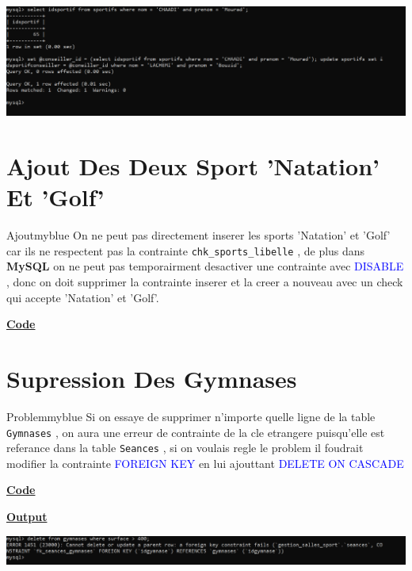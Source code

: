 \vspace{0.25cm}
\begin{center}
    \includegraphics[height=0.25\textheight]{Parties/Partie2/update.PNG}
\end{center}

\newpage
\section{Ajout Des Deux Sport 'Natation' Et 'Golf'}
\begin{prettyBox}{Ajout}{myblue}
On ne peut pas directement inserer les sports 'Natation' et 'Golf' car 
ils ne respectent pas la contrainte \texttt{chk\_sports\_libelle} , de plus
dans \textbf{MySQL} on ne peut pas temporairment desactiver une contrainte 
avec \textcolor{blue}{DISABLE} , donc on doit supprimer la contrainte inserer et la creer a nouveau
avec un check qui accepte 'Natation' et 'Golf'.
\end{prettyBox}

\vspace{0.5cm}
\textbf{\underline{Code}}


\vspace{1cm}
\section{Supression Des Gymnases}
\begin{prettyBox}{Problem}{myblue}
Si on essaye de supprimer n'importe quelle ligne de la table \texttt{Gymnases} , 
on aura une erreur de contrainte de la cle etrangere puisqu'elle est referance dans
la table \texttt{Seances} , si on voulais regle le problem il foudrait modifier la contrainte
\textcolor{blue}{FOREIGN KEY} en lui ajouttant \textcolor{blue}{DELETE ON CASCADE}
\end{prettyBox}

\vspace{0.5cm}
\textbf{\underline{Code}}


\vspace{0.5cm}
\textbf{\underline{Output}}
\vspace{0.25cm}
\begin{center}
    \includegraphics[width=\textwidth]{Parties/Partie2/delete.PNG}
\end{center}



